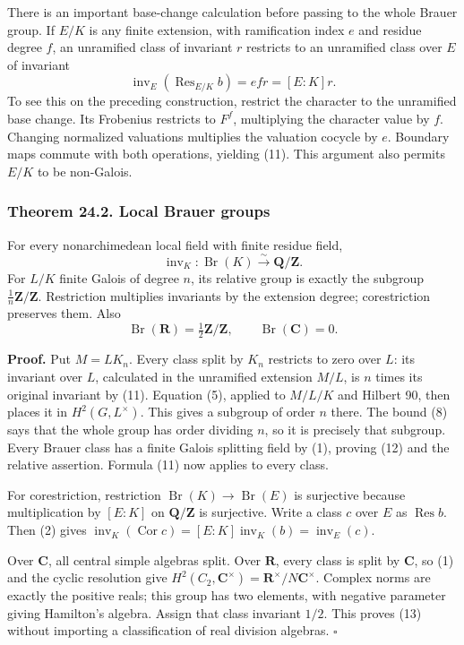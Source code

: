 \documentclass[11pt,a4paper]{article}
\begin{document}
There is an important base-change calculation before passing to the
whole Brauer group. If \(E/K\) is any finite extension, with
ramification index \(e\) and residue degree \(f\), an unramified class
of invariant \(r\) restricts to an unramified class over \(E\) of
invariant \[
\operatorname{inv}_E(\operatorname{Res}_{E/K}b)=efr=[E:K]r.
\tag{11}
\] To see this on the preceding construction, restrict the character to
the unramified base change. Its Frobenius restricts to \(F^f\),
multiplying the character value by \(f\). Changing normalized valuations
multiplies the valuation cocycle by \(e\). Boundary maps commute with
both operations, yielding (11). This argument also permits \(E/K\) to be
non-Galois.

\subsubsection{Theorem 24.2. Local Brauer
groups}\label{theorem-24.2.-local-brauer-groups}

For every nonarchimedean local field with finite residue field, \[
\operatorname{inv}_K:\operatorname{Br}(K)\xrightarrow{\sim}\mathbf Q/\mathbf Z.
\tag{12}
\] For \(L/K\) finite Galois of degree \(n\), its relative group is
exactly the subgroup \(\tfrac1n\mathbf Z/\mathbf Z\). Restriction
multiplies invariants by the extension degree; corestriction preserves
them. Also \[
\operatorname{Br}(\mathbf R)=\tfrac12\mathbf Z/\mathbf Z,
\qquad \operatorname{Br}(\mathbf C)=0.
\tag{13}
\]

\textbf{Proof.} Put \(M=LK_n\). Every class split by \(K_n\) restricts
to zero over \(L\): its invariant over \(L\), calculated in the
unramified extension \(M/L\), is \(n\) times its original invariant by
(11). Equation (5), applied to \(M/L/K\) and Hilbert 90, then places it
in \(H^2(G,L^\times)\). This gives a subgroup of order \(n\) there. The
bound (8) says that the whole group has order dividing \(n\), so it is
precisely that subgroup. Every Brauer class has a finite Galois
splitting field by (1), proving (12) and the relative assertion. Formula
(11) now applies to every class.

For corestriction, restriction
\(\operatorname{Br}(K)\to\operatorname{Br}(E)\) is surjective because
multiplication by \([E:K]\) on \(\mathbf Q/\mathbf Z\) is surjective.
Write a class \(c\) over \(E\) as \(\operatorname{Res}b\). Then (2)
gives
\(\operatorname{inv}_K(\operatorname{Cor}c)=[E:K]\operatorname{inv}_K(b)=\operatorname{inv}_E(c)\).

Over \(\mathbf C\), all central simple algebras split. Over
\(\mathbf R\), every class is split by \(\mathbf C\), so (1) and the
cyclic resolution give
\(H^2(C_2,\mathbf C^\times)=\mathbf R^\times/N\mathbf C^\times\).
Complex norms are exactly the positive reals; this group has two
elements, with negative parameter giving Hamilton's algebra. Assign that
class invariant \(1/2\). This proves (13) without importing a
classification of real division algebras. \(\square\)
\end{document}
